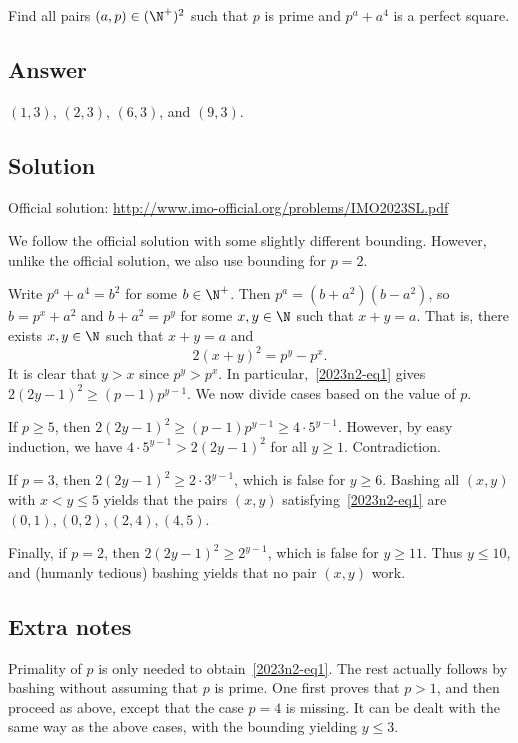 Find all pairs $(a, p) \in (\N^+)^2$ such that $p$ is prime and $p^a + a^4$ is a perfect square.



\subsection*{Answer}

$(1, 3)$, $(2, 3)$, $(6, 3)$, and $(9, 3)$.



\subsection*{Solution}

Official solution: \url{http://www.imo-official.org/problems/IMO2023SL.pdf}

We follow the official solution with some slightly different bounding.
However, unlike the official solution, we also use bounding for $p = 2$.

Write $p^a + a^4 = b^2$ for some $b \in \N^+$.
Then $p^a = (b + a^2)(b - a^2)$, so $b = p^x + a^2$ and $b + a^2 = p^y$ for some $x, y \in \N$ such that $x + y = a$.
That is, there exists $x, y \in \N$ such that $x + y = a$ and
\[ 2(x + y)^2 = p^y - p^x. \tag{1}\label{2023n2-eq1} \]
It is clear that $y > x$ since $p^y > p^x$.
In particular,~\eqref{2023n2-eq1} gives $2(2y - 1)^2 \geq (p - 1) p^{y - 1}$.
We now divide cases based on the value of $p$.

If $p \geq 5$, then $2(2y - 1)^2 \geq (p - 1) p^{y - 1} \geq 4 \cdot 5^{y - 1}$.
However, by easy induction, we have $4 \cdot 5^{y - 1} > 2(2y - 1)^2$ for all $y \geq 1$.
Contradiction.

If $p = 3$, then $2(2y - 1)^2 \geq 2 \cdot 3^{y - 1}$, which is false for $y \geq 6$.
Bashing all $(x, y)$ with $x < y \leq 5$ yields that the pairs $(x, y)$ satisfying~\eqref{2023n2-eq1} are $(0, 1), (0, 2), (2, 4), (4, 5)$.

Finally, if $p = 2$, then $2(2y - 1)^2 \geq 2^{y - 1}$, which is false for $y \geq 11$.
Thus $y \leq 10$, and (humanly tedious) bashing yields that no pair $(x, y)$ work.



\subsection*{Extra notes}

Primality of $p$ is only needed to obtain~\eqref{2023n2-eq1}.
The rest actually follows by bashing without assuming that $p$ is prime.
One first proves that $p > 1$, and then proceed as above, except that the case $p = 4$ is missing.
It can be dealt with the same way as the above cases, with the bounding yielding $y \leq 3$.
